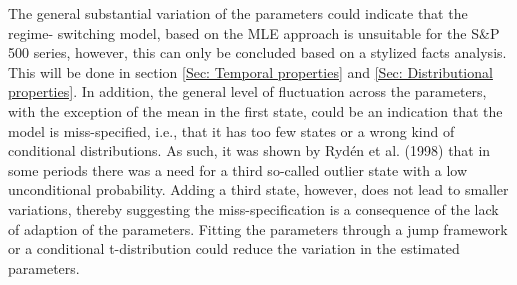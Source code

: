 The general substantial variation of the parameters could indicate that the regime-
switching model, based on the MLE approach is unsuitable for the S\&P 500 series, however, this can only be concluded based on a stylized facts analysis. This will be done in section \ref{Sec: Temporal properties} and \ref{Sec: Distributional properties}. In addition, the general level of fluctuation across the parameters, with the exception of the mean in the first state, could be an indication that the model is miss-specified, i.e., that it has too few states or a wrong kind of conditional distributions. As such, it was shown by Rydén et al. (1998) that in some periods there was a need for a third so-called outlier state with a low unconditional probability. Adding a third state, however, does not lead to smaller variations, thereby suggesting the miss-specification is a consequence of the lack of adaption of the parameters. Fitting the parameters through a jump framework or a conditional t-distribution could reduce the variation in the estimated parameters.

